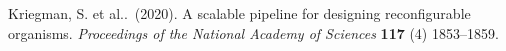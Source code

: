 \documentclass[12pt]{report}
\begin{document}
\vspace{1.5em}
\noindent
Kriegman, S. et al..~(2020).
A scalable pipeline for designing reconfigurable organisms. 
\textit{Proceedings of the National Academy of Sciences} 
\textbf{117} (4) 1853--1859.



\newpage







\tableofcontents
\newpage


\setcounter{page}{1}













\newpage



\end{document}
